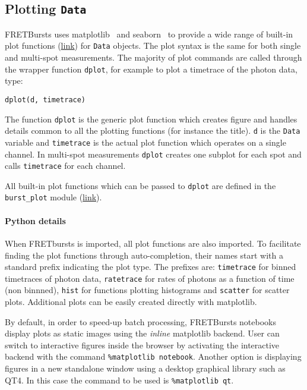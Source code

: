 \subsection{Plotting \texttt{Data}}
\label{sec:plotting}

FRETBursts uses 
matplotlib~\cite{matplotlib}
and seaborn~\cite{seaborn} 
to provide a wide range of built-in plot functions
(\href{http://fretbursts.readthedocs.org/en/latest/plots.html}{link})
for \verb|Data| objects.
The plot syntax is the same for both single and multi-spot measurements.
The majority of plot commands are called through the wrapper function
\verb|dplot|, for example to plot a timetrace of the photon data, type:

\begin{lstlisting}
dplot(d, timetrace)
\end{lstlisting}

The function \verb|dplot| is the generic plot function which creates figure
and handles details common to all the plotting functions (for instance the title).
\verb|d| is the \verb|Data| variable and \verb|timetrace| is the actual plot
function which operates on a single channel. In multi-spot measurements
\verb|dplot| creates one subplot for each spot and calls \verb|timetrace| for
each channel.

All built-in plot functions which can be passed to
\verb|dplot| are defined in the
\verb|burst_plot| module 
(\href{http://fretbursts.readthedocs.org/en/latest/plots.html}{link}).

\paragraph{Python details}
When FRETbursts is imported, all plot functions are also imported.
To facilitate finding the plot functions through auto-completion,
their names start with a standard prefix indicating the
plot type. The prefixes are: \verb|timetrace| for binned timetraces
of photon data, \verb|ratetrace| for rates of photons as a function of time (non
binnned), \verb|hist| for functions plotting histograms and \verb|scatter| for
scatter plots.
Additional plots can be easily created directly with matplotlib.

By default, in order to speed-up batch processing, FRETBursts notebooks display plots 
as static images using the \textit{inline} matplotlib backend. 
User can switch to interactive figures inside the browser by activating 
the interactive backend with the command \verb|%matplotlib notebook|.
Another option is displaying figures in a new standalone window
using a desktop graphical library such as QT4.
In this case the command to be used is \verb|%matplotlib qt|.

